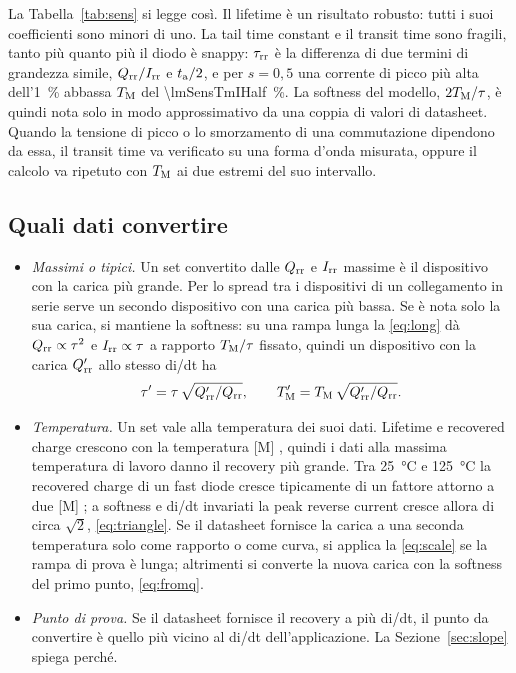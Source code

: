 \documentclass[10pt,a4paper]{scrartcl}
\let\newcommand\pdvaluedefine
\newcommand{\Irr}{I_\mathrm{rr}}
\newcommand{\Qrr}{Q_\mathrm{rr}}
\newcommand{\ta}{t_\mathrm{a}}
\newcommand{\taurr}{\tau_\mathrm{rr}}
\newcommand{\TM}{T_\mathrm{M}}
\begin{document}
La Tabella~\ref{tab:sens} si legge così. Il lifetime è un risultato robusto: tutti i suoi coefficienti sono minori di uno. La tail time constant e il transit time sono fragili, tanto più quanto più il diodo è snappy: $\taurr$ è la differenza di due termini di grandezza simile, $\Qrr/\Irr$ e $\ta/2$, e per $s = 0,5$ una corrente di picco più alta dell'\SI{1}{\percent} abbassa $\TM$ del \SI{\lmSensTmIHalf}{\percent}. La softness del modello, $2\TM/\tau$, è quindi nota solo in modo approssimativo da una coppia di valori di datasheet. Quando la tensione di picco o lo smorzamento di una commutazione dipendono da essa, il transit time va verificato su una forma d'onda misurata, oppure il calcolo va ripetuto con $\TM$ ai due estremi del suo intervallo.

\subsection{Quali dati convertire}
\label{sec:which}
\begin{itemize}
\item \emph{Massimi o tipici.} Un set convertito dalle $\Qrr$ e $\Irr$ massime è il dispositivo con la carica più grande. Per lo spread tra i dispositivi di un collegamento in serie serve un secondo dispositivo con una carica più bassa. Se è nota solo la sua carica, si mantiene la softness: su una rampa lunga la \eqref{eq:long} dà $\Qrr \propto \tau^2$ e $\Irr \propto \tau$ a rapporto $\TM/\tau$ fissato, quindi un dispositivo con la carica $\Qrr'$ allo stesso di/dt ha
\begin{equation}
\tau' = \tau\,\sqrt{\Qrr'/\Qrr} , \qquad \TM' = \TM\,\sqrt{\Qrr'/\Qrr} .
\label{eq:scale}
\end{equation}
\item \emph{Temperatura.} Un set vale alla temperatura dei suoi dati. Lifetime e recovered charge crescono con la temperatura [M] \cite{lutz}, quindi i dati alla massima temperatura di lavoro danno il recovery più grande. Tra \SI{25}{\celsius} e \SI{125}{\celsius} la recovered charge di un fast diode cresce tipicamente di un fattore attorno a due [M] \cite{lutz}; a softness e di/dt invariati la peak reverse current cresce allora di circa $\sqrt{2}$, \eqref{eq:triangle}. Se il datasheet fornisce la carica a una seconda temperatura solo come rapporto o come curva, si applica la \eqref{eq:scale} se la rampa di prova è lunga; altrimenti si converte la nuova carica con la softness del primo punto, \eqref{eq:fromq}.
\item \emph{Punto di prova.} Se il datasheet fornisce il recovery a più di/dt, il punto da convertire è quello più vicino al di/dt dell'applicazione. La Sezione~\ref{sec:slope} spiega perché.
\end{itemize}
\end{document}
